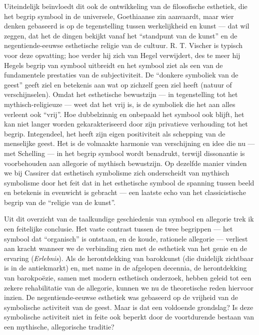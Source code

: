 Uiteindelijk beïnvloedt dit ook de ontwikkeling van de filosofische esthetiek, die het begrip symbool in de universele, Goethiaanse zin aanvaardt, maar wier denken gebaseerd is op de tegenstelling tussen werkelijkheid en kunst — dat wil zeggen, dat het de dingen bekijkt vanaf het ``standpunt van de kunst'' en de negentiende-eeuwse esthetische religie van de cultuur. R. T. Vischer is typisch voor deze opvatting; hoe verder hij zich van Hegel verwijdert, des te meer hij Hegels begrip van symbool uitbreidt en het symbool ziet als een van de fundamentele prestaties van de subjectiviteit. De ``donkere symboliek van de geest'' geeft ziel en betekenis aan wat op zichzelf geen ziel heeft (natuur of verschijnselen). Omdat het esthetische bewustzijn — in tegenstelling tot het mythisch-religieuze — weet dat het vrij is, is de symboliek die het aan alles verleent ook ``vrij''. Hoe dubbelzinnig en onbepaald het symbool ook blijft, het kan niet langer worden gekarakteriseerd door zijn privatieve verhouding tot het begrip. Integendeel, het heeft zijn eigen positiviteit als schepping van de menselijke geest. Het is de volmaakte harmonie van verschijning en idee die nu — met Schelling — in het begrip symbool wordt benadrukt, terwijl dissonantie is voorbehouden aan allegorie of mythisch bewustzijn. Op dezelfde manier vinden we bij Cassirer dat esthetisch symbolisme zich onderscheidt van mythisch symbolisme door het feit dat in het esthetische symbool de spanning tussen beeld en betekenis in evenwicht is gebracht — een laatste echo van het classicistische begrip van de ``religie van de kunst''.

Uit dit overzicht van de taalkundige geschiedenis van symbool en allegorie trek ik een feitelijke conclusie. Het vaste contrast tussen de twee begrippen — het symbool dat ``organisch'' is ontstaan, en de koude, rationele allegorie — verliest aan kracht wanneer we de verbinding zien met de esthetiek van het genie en de ervaring (\textit{Erlebnis}). Als de herontdekking van barokkunst (die duidelijk zichtbaar is in de antiekmarkt) en, met name in de afgelopen decennia, de herontdekking van barokpoëzie, samen met modern esthetisch onderzoek, hebben geleid tot een zekere rehabilitatie van de allegorie, kunnen we nu de theoretische reden hiervoor inzien. De negentiende-eeuwse esthetiek was gebaseerd op de vrijheid van de symbolische activiteit van de geest. Maar is dat een voldoende grondslag? Is deze symbolische activiteit niet in feite ook beperkt door de voortdurende bestaan van een mythische, allegorische traditie?


